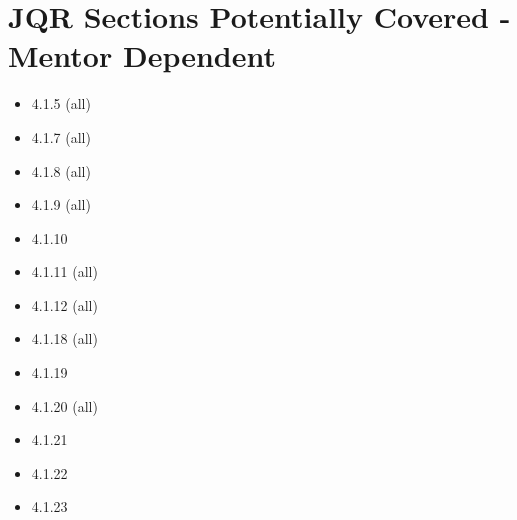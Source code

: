\documentclass[letterpaper,12pt]{article}
\begin{document}
	\section{JQR Sections Potentially Covered - Mentor Dependent}
	\begin{itemize}
		\item 4.1.5 (all)
		\item 4.1.7 (all)
		\item 4.1.8 (all)
		\item 4.1.9 (all)
		\item 4.1.10
		\item 4.1.11 (all)
		\item 4.1.12 (all)
		\item 4.1.18 (all)
		\item 4.1.19
		\item 4.1.20 (all)
		\item 4.1.21
		\item 4.1.22
		\item 4.1.23
	\end{itemize}
	
	
\end{document}
